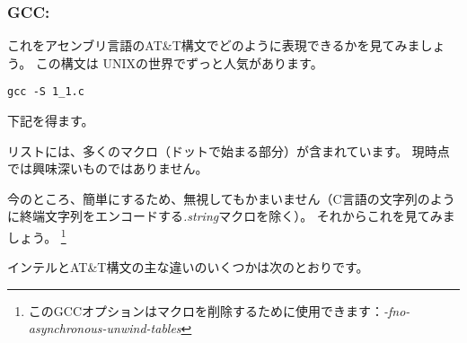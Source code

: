 \subsubsection{GCC: \ATTSyntax}
\label{ATT_syntax}

これをアセンブリ言語のAT\&T構文でどのように表現できるかを見てみましょう。 この構文は
UNIXの世界でずっと人気があります。

\begin{lstlisting}[caption=let's compile in GCC 4.7.3]
gcc -S 1_1.c
\end{lstlisting}

下記を得ます。



リストには、多くのマクロ（ドットで始まる部分）が含まれています。 現時点では興味深いものではありません。

今のところ、簡単にするため、無視してもかまいません（C言語の文字列のように終端文字列をエンコードする\emph{.string}マクロを除く）。 
それからこれを見てみましょう。
\footnote{このGCCオプションはマクロを削除するために使用できます：\emph{-fno-asynchronous-unwind-tables}}



\myindex{\ATTSyntax}
\myindex{\IntelSyntax}
インテルとAT\&T構文の主な違いのいくつかは次のとおりです。

